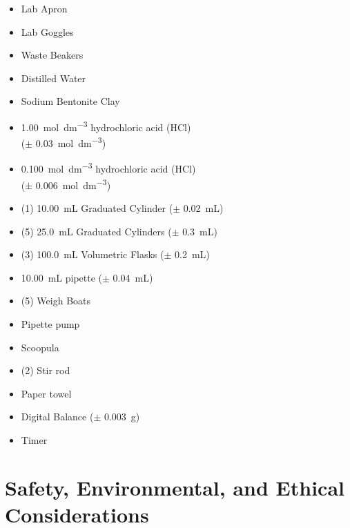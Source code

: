 \documentclass[11pt, letterpaper]{article}
\begin{document}
\begin{multicols}{2}
    \begin{itemize}
        \item Lab Apron
        \item Lab Goggles
        \item Waste Beakers
        \item Distilled Water
        \item Sodium Bentonite Clay
        \item \SI{1.00}{mol.dm^{-3}} hydrochloric acid (HCl) \\ (\(\pm\) \SI{0.03}{mol.dm^{-3}})
        \item \SI{0.100}{mol.dm^{-3}} hydrochloric acid (HCl) \\ (\(\pm\) \SI{0.006}{mol.dm^{-3}})
        \item (1) \SI{10.00}{mL} Graduated Cylinder (\(\pm\) \SI{0.02}{mL})
        \item (5) \SI{25.0}{mL} Graduated Cylinders (\(\pm\) \SI{0.3}{mL})
        \item (3) \SI{100.0}{mL} Volumetric Flasks (\(\pm\) \SI{0.2}{mL})
        \item \SI{10.00}{mL} pipette (\(\pm\) \SI{0.04}{mL})
        \item (5) Weigh Boats
        \item Pipette pump
        \item Scoopula
        \item (2) Stir rod
        \item Paper towel
        \item Digital Balance (\(\pm\) \SI{0.003}{g})
        \item Timer
    \end{itemize}

\end{multicols}

\section{Safety, Environmental, and Ethical Considerations}
\end{document}
